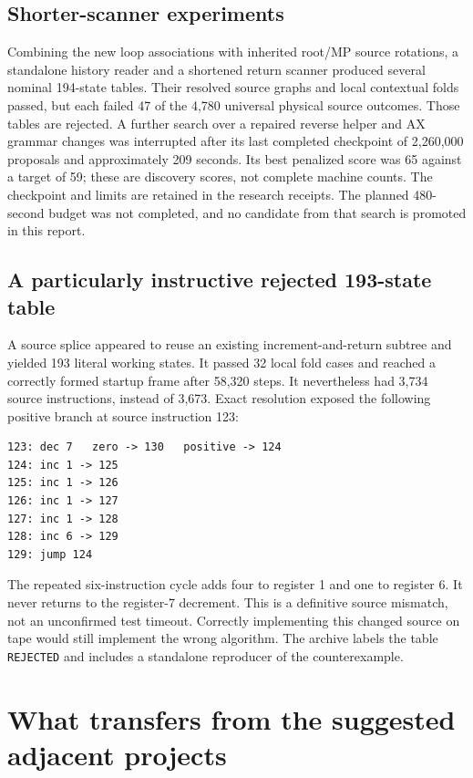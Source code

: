 \documentclass[11pt,a4paper]{article}
\begin{document}
\subsection{Shorter-scanner experiments}

Combining the new loop associations with inherited root/MP source
rotations, a standalone history reader and a shortened return scanner
produced several nominal 194-state tables. Their resolved source graphs
and local contextual folds passed, but each failed 47 of the 4,780
universal physical source outcomes. Those tables are rejected. A further
search over a repaired reverse helper and AX grammar changes was
interrupted after its last completed checkpoint of 2,260,000 proposals
and approximately 209 seconds. Its best penalized score was 65 against
a target of 59; these are discovery scores, not complete machine counts.
The checkpoint and limits are retained in the research receipts. The
planned 480-second budget was not completed, and no candidate from that
search is promoted in this report.

\subsection{A particularly instructive rejected 193-state table}

A source splice appeared to reuse an existing increment-and-return
subtree and yielded 193 literal working states. It passed 32 local fold
cases and reached a correctly formed startup frame after 58,320 steps.
It nevertheless had 3,734 source instructions, instead of 3,673. Exact
resolution exposed the following positive branch at source instruction
123:
\begin{lstlisting}
123: dec 7   zero -> 130   positive -> 124
124: inc 1 -> 125
125: inc 1 -> 126
126: inc 1 -> 127
127: inc 1 -> 128
128: inc 6 -> 129
129: jump 124
\end{lstlisting}
The repeated six-instruction cycle adds four to register 1 and one to
register 6. It never returns to the register-7 decrement. This is a
definitive source mismatch, not an unconfirmed test timeout. Correctly
implementing this changed source on tape would still implement the wrong
algorithm. The archive labels the table \texttt{REJECTED} and includes
a standalone reproducer of the counterexample.

\section{What transfers from the suggested adjacent projects}
\end{document}
